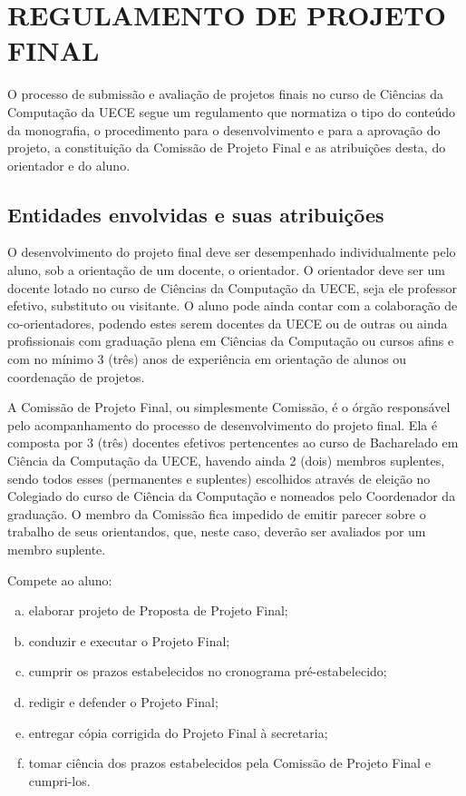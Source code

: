 \chapter{REGULAMENTO DE PROJETO FINAL}
\label{cha:regulamento}

O processo de submissão e avaliação de projetos finais no curso
de Ciências da Computa\-ção da UECE segue um regulamento que normatiza 
o tipo do conteúdo da monografia, o procedimento para o desenvolvimento 
e para a aprovação do projeto, a constituição da Comissão de Projeto 
Final e as atribuições desta, do orientador e do aluno. 

\section{Entidades envolvidas e suas atribuições}
O desenvolvimento do projeto final deve ser desempenhado individualmente
pelo aluno, sob a orientação de um docente, o orientador. O orientador deve
ser um docente lotado no curso de Ciências da Computação da UECE, seja ele
professor efetivo, substituto ou visitante. O aluno pode ainda contar com a
colaboração de co-orientadores, podendo estes serem docentes da UECE ou de 
outras  ou ainda profissionais com graduação
plena em Ciências da Computação ou cursos afins e com no mínimo 3 (três) anos
de experiência em orientação de alunos ou coordenação de projetos.

A Comissão de Projeto Final, ou simplesmente Comissão, é o órgão 
responsável pelo acompanhamento do processo de desenvolvimento do projeto final. 
Ela é composta por 3 (três) docentes efetivos pertencentes ao curso de 
Bacharelado em Ciência da Computação da UECE, havendo ainda 2 (dois) membros 
suplentes, sendo todos esses (permanentes e suplentes) escolhidos através de 
eleição no Colegiado do curso de Ciência da Computação e nomeados pelo 
Coordenador da graduação. O membro da Comissão fica impedido de emitir 
parecer sobre o trabalho de seus orientandos, que, neste caso, 
deverão ser avaliados por um membro suplente.

Compete ao aluno:
\begin{enumerate}[a.]
\item elaborar projeto de Proposta de Projeto Final;
\item conduzir e executar o Projeto Final;
\item cumprir os prazos estabelecidos no cronograma pré-estabelecido;
\item redigir e defender o Projeto Final;
\item entregar cópia corrigida do Projeto Final à secretaria;
\item tomar ciência dos prazos estabelecidos pela Comissão de Projeto Final e cumpri-los.
\end{enumerate}

